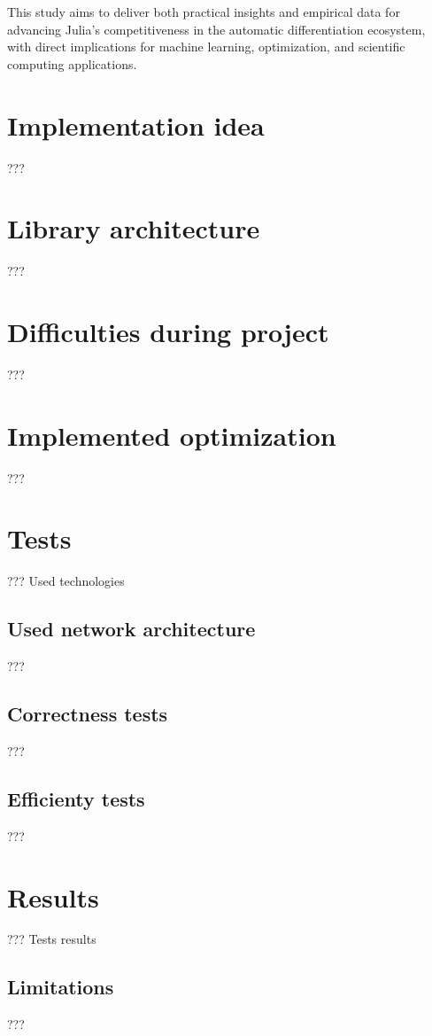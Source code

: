\documentclass[conference]{IEEEtran}
\begin{document}
This study aims to deliver both practical insights and empirical data for advancing 
Julia's competitiveness in the automatic differentiation ecosystem, 
with direct implications for machine learning, optimization, 
and scientific computing applications.

\section{Implementation idea}
???

\section{Library architecture}
???

\section{Difficulties during project}
???

\section{Implemented optimization}
???

\section{Tests}
???
Used technologies

\subsection{Used network architecture}
???

\subsection{Correctness tests}
???

\subsection{Efficienty tests}
???

\section{Results}
??? Tests results

\subsection{Limitations}
???
\end{document}
